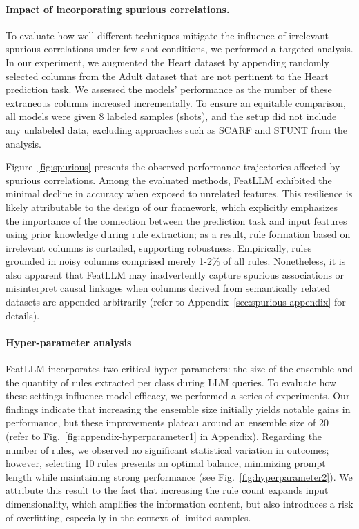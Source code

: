 \vspace*{-0.12in}
\paragraph{Impact of incorporating spurious correlations.} To evaluate how well different techniques mitigate the influence of irrelevant spurious correlations under few-shot conditions, we performed a targeted analysis. In our experiment, we augmented the Heart dataset by appending randomly selected columns from the Adult dataset that are not pertinent to the Heart prediction task. We assessed the models’ performance as the number of these extraneous columns increased incrementally. To ensure an equitable comparison, all models were given 8 labeled samples (shots), and the setup did not include any unlabeled data, excluding approaches such as SCARF and STUNT from the analysis.

Figure~\ref{fig:spurious} presents the observed performance trajectories affected by spurious correlations. Among the evaluated methods, \textsf{FeatLLM} exhibited the minimal decline in accuracy when exposed to unrelated features. This resilience is likely attributable to the design of our framework, which explicitly emphasizes the importance of the connection between the prediction task and input features using prior knowledge during rule extraction; as a result, rule formation based on irrelevant columns is curtailed, supporting robustness. Empirically, rules grounded in noisy columns comprised merely 1-2\% of all rules. Nonetheless, it is also apparent that \textsf{FeatLLM} may inadvertently capture spurious associations or misinterpret causal linkages when columns derived from semantically related datasets are appended arbitrarily (refer to Appendix~\ref{sec:spurious-appendix} for details).

\vspace*{-0.12in}
\paragraph{Hyper-parameter analysis}
\textsf{FeatLLM} incorporates two critical hyper-parameters: the size of the ensemble and the quantity of rules extracted per class during LLM queries. To evaluate how these settings influence model efficacy, we performed a series of experiments. Our findings indicate that increasing the ensemble size initially yields notable gains in performance, but these improvements plateau around an ensemble size of 20 (refer to Fig.~\ref{fig:appendix-hyperparameter1} in Appendix). Regarding the number of rules, we observed no significant statistical variation in outcomes; however, selecting 10 rules presents an optimal balance, minimizing prompt length while maintaining strong performance (see Fig.~\ref{fig:hyperparameter2}). We attribute this result to the fact that increasing the rule count expands input dimensionality, which amplifies the information content, but also introduces a risk of overfitting, especially in the context of limited samples.

